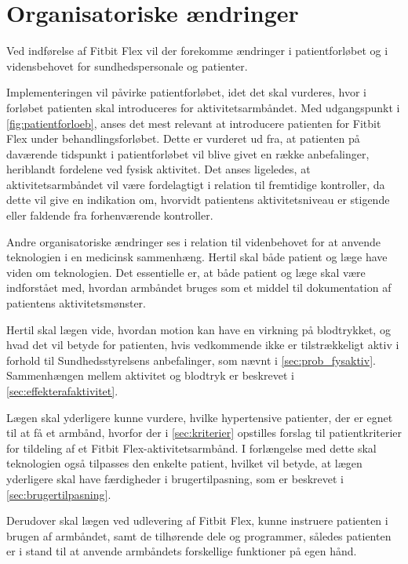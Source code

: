 \section{Organisatoriske ændringer}\label{sec:org_aendringer}
Ved indførelse af Fitbit Flex vil der forekomme ændringer i patientforløbet og i vidensbehovet for sundhedspersonale og patienter. 

Implementeringen vil påvirke patientforløbet, idet det skal vurderes, hvor i forløbet patienten skal introduceres for aktivitetsarmbåndet. 
Med udgangspunkt i \autoref{fig:patientforloeb}, anses det mest relevant at introducere patienten for Fitbit Flex under behandlingsforløbet. Dette er vurderet ud fra, at patienten på daværende tidspunkt i patientforløbet vil blive givet en række anbefalinger, heriblandt fordelene ved fysisk aktivitet. 
Det anses ligeledes, at aktivitetsarmbåndet vil være fordelagtigt i relation til fremtidige kontroller, da dette vil give en indikation om, hvorvidt patientens aktivitetsniveau er stigende eller faldende fra forhenværende kontroller.   

Andre organisatoriske ændringer ses i relation til videnbehovet for at anvende teknologien i en medicinsk sammenhæng. Hertil skal både patient og læge have viden om teknologien. Det essentielle er, at både patient og læge skal være indforstået med, hvordan armbåndet bruges som et middel til dokumentation af patientens aktivitetsmønster.

Hertil skal lægen vide, hvordan motion kan have en virkning på blodtrykket, og hvad det vil betyde for patienten, hvis vedkommende ikke er tilstrækkeligt aktiv i forhold til Sundhedsstyrelsens anbefalinger, som nævnt i \autoref{sec:prob_fysaktiv}. Sammenhængen mellem aktivitet og blodtryk er beskrevet i \autoref{sec:effekterafaktivitet}.

Lægen skal yderligere kunne vurdere, hvilke hypertensive patienter, der er egnet til at få et armbånd, hvorfor der i \autoref{sec:kriterier} opstilles forslag til patientkriterier for tildeling af et Fitbit Flex-aktivitetsarmbånd. I forlængelse med dette skal teknologien også tilpasses den enkelte patient, hvilket vil betyde, at lægen yderligere skal have færdigheder i brugertilpasning, som er beskrevet i \autoref{sec:brugertilpasning}. 

Derudover skal lægen ved udlevering af Fitbit Flex, kunne instruere patienten i brugen af armbåndet, samt de tilhørende dele og programmer, således patienten er i stand til at anvende armbåndets forskellige funktioner på egen hånd. 

